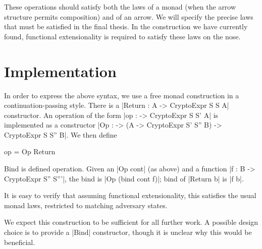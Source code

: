 These operations should satisfy both the laws of a monad (when the arrow structure permits composition) and of an arrow.
We will specify the precise laws that must be satisfied in the final thesis.  In the construction we have currently
found, functional extensionality is required to satisfy these laws on the nose.

\section{Implementation}

In order to express the above syntax, we use a free monad construction in a continuation-passing style.  There is a
|Return : A -> CryptoExpr S S A| constructor.  An operation of the form |op : \Gamma -> CryptoExpr S S' A| is
implemented as a constructor |Op : \Gamma -> (A -> CryptoExpr S' S'' B) -> CryptoExpr S S'' B|.  We then define
\begin{code}
    op \gamma = Op \gamma Return
\end{code}

Bind is defined operation.  Given an |Op \gamma cont| (as above) and a function |f : B -> CryptoExpr S'' S'''|, the
bind is |Op \gamma (bind cont f)|; bind of |Return b| is |f b|.

It is easy to verify that assuming functional extensionality, this satisfies the usual monad laws, restricted to
matching adversary states.

We expect this construction to be sufficient for all further work.  A possible design choice is to provide a |Bind|
constructor, though it is unclear why this would be beneficial.


